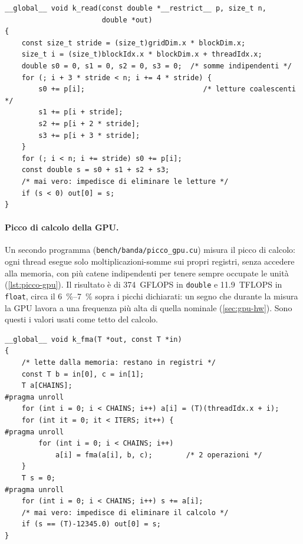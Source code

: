 \documentclass[11pt,a4paper]{article}
\begin{document}
\begin{lstlisting}[caption={Kernel di lettura per la misura della banda (\texttt{banda\_gpu.cu}).}, label={lst:banda-gpu}]
__global__ void k_read(const double *__restrict__ p, size_t n,
                       double *out)
{
    const size_t stride = (size_t)gridDim.x * blockDim.x;
    size_t i = (size_t)blockIdx.x * blockDim.x + threadIdx.x;
    double s0 = 0, s1 = 0, s2 = 0, s3 = 0;  /* somme indipendenti */
    for (; i + 3 * stride < n; i += 4 * stride) {
        s0 += p[i];                            /* letture coalescenti */
        s1 += p[i + stride];
        s2 += p[i + 2 * stride];
        s3 += p[i + 3 * stride];
    }
    for (; i < n; i += stride) s0 += p[i];
    const double s = s0 + s1 + s2 + s3;
    /* mai vero: impedisce di eliminare le letture */
    if (s < 0) out[0] = s;
}
\end{lstlisting}

\paragraph{Picco di calcolo della GPU.} Un secondo programma
(\texttt{bench/banda/picco\_gpu.cu}) misura il picco di calcolo: ogni thread
esegue solo moltiplicazioni-somme sui propri registri, senza accedere alla
memoria, con più catene indipendenti per tenere sempre occupate le unità (\cref{lst:picco-gpu}). Il
risultato è di \SI{374}{GFLOPS} in \texttt{double} e \SI{11.9}{TFLOPS} in
\texttt{float}, circa il \SIrange{6}{7}{\percent} sopra i picchi dichiarati: un
segno che durante la misura la GPU lavora a una frequenza più alta di quella
nominale (\cref{sec:gpu-hw}). Sono questi i valori usati come tetto del calcolo.

\begin{lstlisting}[caption={Kernel per la misura del picco di calcolo (\texttt{picco\_gpu.cu}, \texttt{CHAINS} = 8).}, label={lst:picco-gpu}]
__global__ void k_fma(T *out, const T *in)
{
    /* lette dalla memoria: restano in registri */
    const T b = in[0], c = in[1];
    T a[CHAINS];
#pragma unroll
    for (int i = 0; i < CHAINS; i++) a[i] = (T)(threadIdx.x + i);
    for (int it = 0; it < ITERS; it++) {
#pragma unroll
        for (int i = 0; i < CHAINS; i++)
            a[i] = fma(a[i], b, c);        /* 2 operazioni */
    }
    T s = 0;
#pragma unroll
    for (int i = 0; i < CHAINS; i++) s += a[i];
    /* mai vero: impedisce di eliminare il calcolo */
    if (s == (T)-12345.0) out[0] = s;
}
\end{lstlisting}
\end{document}
